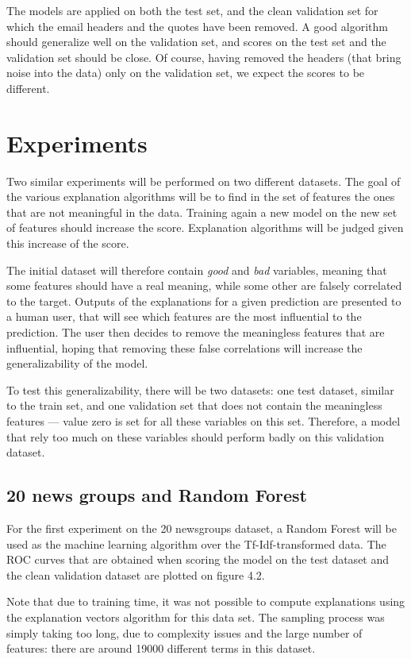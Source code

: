 \documentclass[a4paper,11pt]{kth-mag}
\begin{document}
The models are applied on both the test set, and the clean validation set for which the email headers and the quotes have been removed. A good algorithm should generalize well on the validation set, and scores on the test set and the validation set should be close. Of course, having removed the headers (that bring noise into the data) only on the validation set, we expect the scores to be different.


\chapter{Experiments}

Two similar experiments will be performed on two different datasets. The goal of the various explanation algorithms will be to find in the set of features the ones that are not meaningful in the data. Training again a new model on the new set of features should increase the score. Explanation algorithms will be judged given this increase of the score.

The initial dataset will therefore contain \textit{good} and \textit{bad} variables, meaning that some features should have a real meaning, while some other are falsely correlated to the target. Outputs of the explanations for a given prediction are presented to a human user, that will see which features are the most influential to the prediction. The user then decides to remove the meaningless features that are influential, hoping that removing these false correlations will increase the generalizability of the model.

To test this generalizability, there will be two datasets: one test dataset, similar to the train set, and one validation set that does not contain the meaningless features --- value zero is set for all these variables on this set. Therefore, a model that rely too much on these variables should perform badly on this validation dataset.

\section{20 news groups and Random Forest}

For the first experiment on the 20 newsgroups dataset, a Random Forest will be used as the machine learning algorithm over the Tf-Idf-transformed data. The ROC curves that are obtained when scoring the model on the test dataset and the clean validation dataset are plotted on figure 4.2.

Note that due to training time, it was not possible to compute explanations using the explanation vectors algorithm for this data set. The sampling process was simply taking too long, due to complexity issues and the large number of features: there are around 19000 different terms in this dataset.
\end{document}
